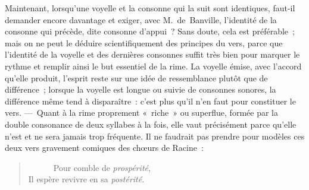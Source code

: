 \documentclass[french,twoside]{book} %
\begin{document}
Maintenant, lorsqu’une voyelle et la consonne qui la suit sont identiques, faut-il demander encore davantage et exiger, avec M. de Banville, l’identité de la consonne qui précède, dite consonne d’appui ? Sans doute, cela est préférable ; mais on ne peut le déduire scientifiquement des principes du vers, parce que l’identité de la voyelle et des dernières consonnes suffit très bien pour marquer le rythme et remplir ainsi le but essentiel de la rime. La voyelle émise, avec l’accord qu’elle produit, l’esprit reste sur une idée de ressemblance plutôt que de différence ; lorsque la voyelle est longue ou suivie de consonnes sonores, la différence même tend à disparaître : c’est plus qu’il n’en faut pour constituer le vers. — Quant à la rime proprement « riche » ou superflue, formée par la double consonance de deux syllabes à la fois, elle vaut précisément parce qu’elle n’est et ne sera jamais trop fréquente. Il ne faudrait pas prendre pour modèles ces deux vers gravement comiques des chœurs de Racine :\par


\begin{verse}
      Pour comble de \emph{prospérité},\\
Il espère revivre en sa \emph{postérité}.\\
\end{verse}
\end{document}
